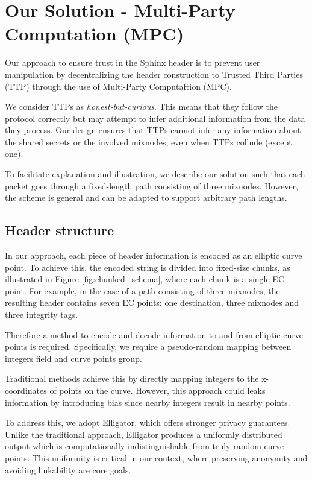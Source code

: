\section{Our Solution - Multi-Party Computation (MPC)}\label{sec:scheme}

Our approach to ensure trust in the Sphinx header is to prevent user manipulation by decentralizing the header construction to Trusted Third Parties (TTP) through the use of Multi-Party Computaftion (MPC).
\newline

We consider TTPs as \textit{honest-but-curious}.
This means that they follow the protocol correctly but may attempt to infer additional information from the data they process.
Our design ensures that TTPs cannot infer any information about the shared secrets  or the involved mixnodes, even when TTPs collude (except one).
\newline

To facilitate explanation and illustration, we describe our solution such that each packet goes through a fixed-length path consisting of three mixnodes.
However, the scheme is general and can be adapted to support arbitrary path lengths. 


\subsection{Header structure}

In our approach, each piece of header information is encoded as an elliptic curve point. 
To achieve this, the encoded string is divided into fixed-size chunks, as illustrated in Figure \ref{fig:chunked_schema}, where each chunk is a single EC point. 
For example, in the case of a path consisting of three mixnodes, the resulting header contains seven EC points: one destination, three mixnodes and three integrity tags.

Therefore a method to encode and decode information to and from elliptic curve points is required. 
Specifically, we require a pseudo-random mapping between integers field and curve points group.

Traditional methods achieve this by directly mapping integers to the x-coordinates of points on the curve. 
However, this approach could leaks information by introducing bias since nearby integers result in nearby points.

To address this, we adopt Elligator, which offers stronger privacy guarantees. 
Unlike the traditional approach, Elligator produces a uniformly distributed output which is computationally indistinguishable from truly random curve points. 
This uniformity is critical in our context, where preserving anonymity and avoiding linkability are core goals. 

